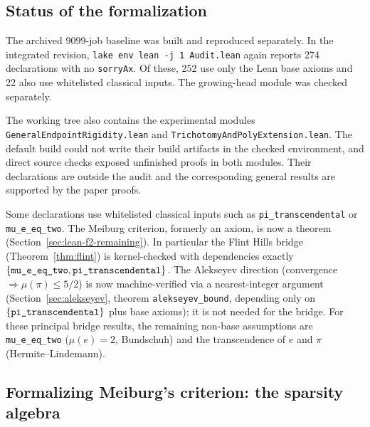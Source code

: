 \documentclass[11pt]{amsart}
\theoremstyle{definition}
\theoremstyle{remark}
\numberwithin{equation}{section}
\newcommand{\irr}{\mu}
\newcommand{\ee}{e}
\begin{document}
\subsection{Status of the formalization}\label{sec:lean-status}

The archived 9099-job baseline was built and reproduced separately.
In the integrated revision, \texttt{lake env lean -j 1 Audit.lean} again
reports 274 declarations with no \texttt{sorryAx}. Of these, 252 use
only the Lean base axioms and 22 also use whitelisted classical inputs.
The growing-head module was checked separately.

The working tree also contains the experimental modules
\texttt{General\allowbreak Endpoint\allowbreak Rigidity.lean} and
\texttt{Trichotomy\allowbreak And\allowbreak Poly\allowbreak Extension.lean}.
The default build could not write their build artifacts in the checked
environment, and direct source checks exposed unfinished proofs in both
modules. Their declarations are outside the audit and the corresponding
general results are supported by the paper proofs.

Some declarations use whitelisted classical inputs such
as \texttt{pi\_transcendental} or \texttt{mu\_e\_eq\_two}.
The Meiburg criterion, formerly an axiom, is now a theorem (Section~\ref{sec:lean-f2-remaining}). In particular the Flint Hills bridge (Theorem~\ref{thm:flint}) is kernel-checked with dependencies exactly $\{\texttt{mu\_\allowbreak{}e\_\allowbreak{}eq\_\allowbreak{}two},\texttt{pi\_\allowbreak{}transcendental}\}$. The Alekseyev direction (convergence $\Rightarrow\irr(\pi)\le5/2$) is now machine-verified via a nearest-integer argument (Section~\ref{sec:alekseyev}, theorem \texttt{alekseyev\_\allowbreak{}bound}, depending only on $\{\texttt{pi\_\allowbreak{}transcendental}\}$ plus base axioms); it is not needed for the bridge. For these principal bridge results, the remaining non-base assumptions are \texttt{mu\_\allowbreak{}e\_\allowbreak{}eq\_\allowbreak{}two} ($\irr(\ee)=2$, Bundschuh) and the transcendence of $\ee$ and $\pi$ (Hermite--Lindemann).

\subsection{Formalizing Meiburg's criterion: the sparsity algebra}\label{sec:lean-f2}
\end{document}
